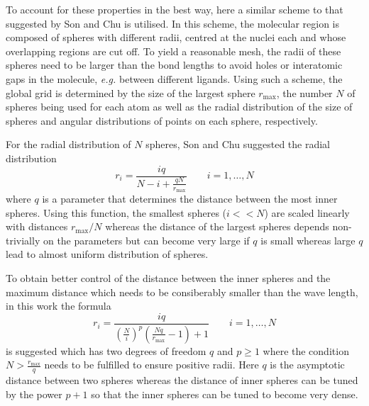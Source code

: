 To account for these properties in the best way, here a similar scheme to that suggested by Son and Chu \cite{Son_Chu} is utilised.
In this scheme, the molecular region is composed of spheres with different radii, centred at the nuclei each and whose overlapping regions are cut off.
To yield a reasonable mesh, the radii of these spheres need to be larger than the bond lengths to avoid holes or interatomic gaps in the molecule, \textit{e.g.} between different ligands.
Using such a scheme, the global grid is determined by the size of the largest sphere $r_\text{max}$, the number $N$ of spheres being used for each atom as well as the radial distribution of the size of spheres and angular distributions of points on each sphere, respectively.

For the radial distribution of $N$ spheres, Son and Chu \cite{Son_Chu0} suggested the radial distribution
\begin{equation} \label{eq:son_map}
r_i=\frac{iq}{N-i+\frac{qN}{r_\text{max}}} \qquad i=1,\hdots ,N 
\end{equation}
where $q$ is a parameter that determines the distance between the most inner spheres.
Using this function, the smallest spheres ($i<<N$) are scaled linearly with distances $r_\text{max}/N$ whereas the distance of the largest spheres depends non-trivially on the parameters but can become very large if $q$ is small whereas large $q$ lead to almost uniform distribution of spheres.

To obtain better control of the distance between the inner spheres and the maximum distance which needs to be consiberably smaller than the wave length, in this work the formula
\begin{equation} \label{eq:tm_map}
r_i=\frac{iq}{\left( \frac Ni \right)^p \left(\frac{Nq}{r_\text{max}}-1\right) +1} \qquad i=1,\hdots ,N 
\end{equation}
is suggested which has two degrees of freedom $q$ and $p\geq 1$ where the condition $N>\frac{r_\text{max}}{q}$ needs to be fulfilled to ensure positive radii.
Here $q$ is the asymptotic distance between two spheres whereas the distance of inner spheres can be tuned by the power $p+1$ so that the inner spheres can be tuned to become very dense.

